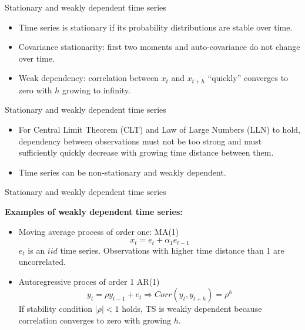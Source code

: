 \documentclass{beamer}
\begin{document}

\begin{frame}{Stationary and weakly dependent time series}
\begin{itemize}
\item Time series is stationary if its probability distributions are stable over time.

\vspace{0.5cm}

\item Covariance stationarity: first two moments and auto-covariance do not change over time.

\vspace{0.5cm}

\item Weak dependency: correlation between $x_t$ and $x_{t+h}$ ``quickly'' converges to zero with $h$ growing to infinity.
\end{itemize}
\end{frame}


\begin{frame}{Stationary and weakly dependent time series}
\begin{itemize}
\item For Central Limit Theorem (CLT) and Law of Large Numbers (LLN) to hold, dependency between observations must not be too strong and must sufficiently quickly decrease with growing time distance between them.

\vspace{0.5cm}

\item Time series can be non-stationary and weakly dependent.
\end{itemize}
\end{frame}


\begin{frame}{Stationary and weakly dependent time series}

\textbf{Examples of weakly dependent time series:}
\vspace{0.5cm}
\begin{itemize}
\item Moving average process of order one: MA(1)
$$x_t=e_t+\alpha_1 e_{t-1}$$
$e_t$ is an $\textit{iid}$ time series. Observations with higher time distance than 1 are uncorrelated.

\vspace{0.5cm}

\item Autoregressive proces of order 1 AR(1)
$$y_t=\rho y_{t-1} + e_t \Rightarrow Corr(y_t,y_{t+h})=\rho^h$$
If stability condition $|\rho|<1$ holds, TS is weakly dependent because correlation converges  to zero with growing $h$.
\end{itemize}

\end{frame}
\end{document}
